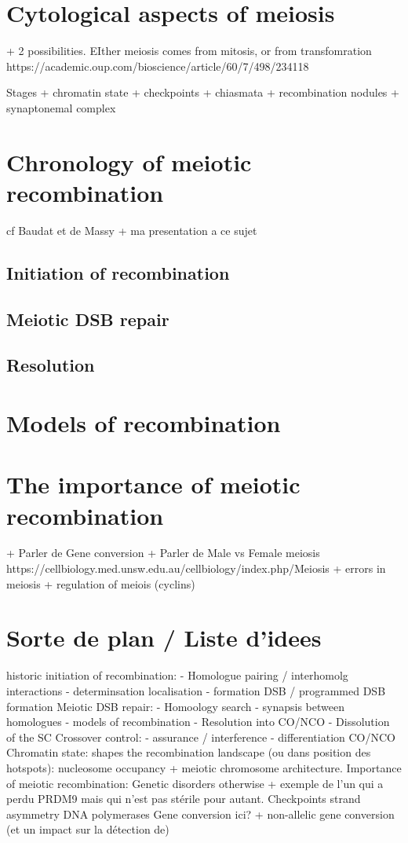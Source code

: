 \section{Cytological aspects of meiosis}
+ 2 possibilities. EIther meiosis comes from mitosis, or from transfomration https://academic.oup.com/bioscience/article/60/7/498/234118

Stages + chromatin state + checkpoints + chiasmata + recombination nodules + synaptonemal complex

\section{Chronology of meiotic recombination}
cf Baudat et de Massy + ma presentation a ce sujet
\subsection{Initiation of recombination}
\subsection{Meiotic DSB repair}
\subsection{Resolution}

\section{Models of recombination}

\section{The importance of meiotic recombination}


+ Parler de Gene conversion
+ Parler de Male vs Female meiosis  https://cellbiology.med.unsw.edu.au/cellbiology/index.php/Meiosis
+ errors in meiosis
+ regulation of meiois (cyclins)






\section*{Sorte de plan / Liste d'idees}
historic
initiation of recombination: 
- Homologue pairing / interhomolg interactions
- determinsation localisation
- formation DSB / programmed DSB formation
Meiotic DSB repair:
- Homoology search
- synapsis between homologues
- models of recombination
- Resolution into CO/NCO
- Dissolution of the SC
Crossover control: 
- assurance / interference
- differentiation CO/NCO
Chromatin state: shapes the recombination landscape (ou dans position des hotspots): nucleosome occupancy + meiotic chromosome architecture. 
Importance of meiotic recombination: Genetic disorders otherwise + exemple de l'un qui a perdu PRDM9 mais qui n'est pas stérile pour autant. 
Checkpoints
strand asymmetry
DNA polymerases
Gene conversion ici? + non-allelic gene conversion (et un impact sur la détection de)



